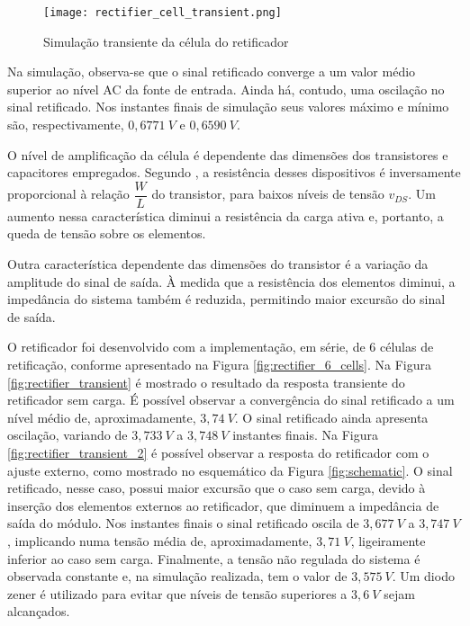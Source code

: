 \begin{figure}[!htb]
	\caption{\label{fig:rectifier_cell_transient}Simulação transiente da célula do retificador}
	\begin{center}
		\texttt{[image: rectifier\_cell\_transient.png]}
	\end{center}
\end{figure}

Na simulação, observa-se que o sinal retificado converge a um valor médio superior ao nível AC da fonte de entrada. Ainda há, contudo, uma oscilação no sinal retificado. Nos instantes finais de simulação seus valores máximo e mínimo são, respectivamente, $0,6771~V$ e $0,6590~V$.

O nível de amplificação da célula é dependente das dimensões dos transistores e capacitores empregados. Segundo , a resistência desses dispositivos é inversamente proporcional à relação $\dfrac{W}{L}$ do transistor, para baixos níveis de tensão $v_{DS}$. Um aumento nessa característica diminui a resistência da carga ativa e, portanto, a queda de tensão sobre os elementos.

Outra característica dependente das dimensões do transistor é a variação da amplitude do sinal de saída. À medida que a resistência dos elementos diminui, a impedância do sistema também é reduzida, permitindo maior excursão do sinal de saída.

O retificador foi desenvolvido com a implementação, em série, de 6 células de retificação, conforme apresentado na Figura \ref{fig:rectifier_6_cells}. Na Figura \ref{fig:rectifier_transient} é mostrado o resultado da resposta transiente do retificador sem carga. É possível observar a convergência do sinal retificado a um nível médio de, aproximadamente, $3,74~V$. O sinal retificado ainda apresenta oscilação, variando de $3,733~V$ a $3,748~V$ instantes finais. Na Figura \ref{fig:rectifier_transient_2} é possível observar a resposta do retificador com o ajuste externo, como mostrado no esquemático da Figura \ref{fig:schematic}. O sinal retificado, nesse caso, possui maior excursão que o caso sem carga, devido à inserção dos elementos externos ao retificador, que diminuem a impedância de saída do módulo. Nos instantes finais o sinal retificado oscila de $3,677~V$ a $3,747~V$, implicando numa tensão média de, aproximadamente, $3,71~V$, ligeiramente inferior ao caso sem carga. Finalmente, a tensão não regulada do sistema é observada constante e, na simulação realizada, tem o valor de $3,575~V$. Um diodo zener é utilizado para evitar que níveis de tensão superiores a $3,6~V$ sejam alcançados.

